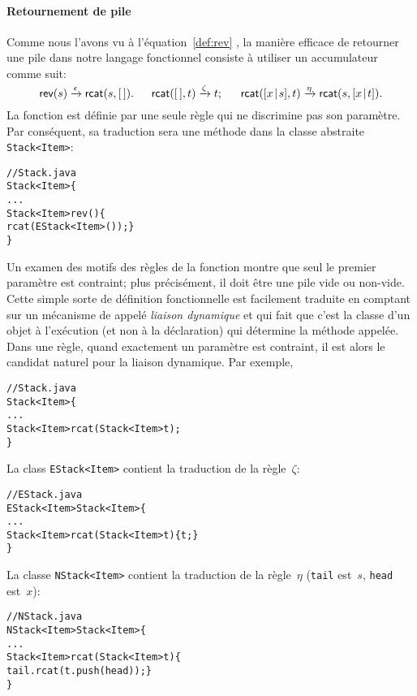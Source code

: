 \paragraph{Retournement de pile}

Comme nous l'avons vu à l'équation~\eqref{def:rev} ,
la manière efficace de retourner une pile dans notre langage
fonctionnel consiste à utiliser un accumulateur comme suit:
\begin{equation*}
\textsf{rev}(s) \xrightarrow{\smash{\epsilon}}
             \textsf{rcat}(s,[\,]).\quad\;\;
\textsf{rcat}([\,],t) \xrightarrow{\smash{\zeta}} t;\quad\;\;
\textsf{rcat}([{x}\!\mid\!{s}],t) \xrightarrow{\smash{\eta}}
                          \textsf{rcat}(s,[{x}\!\mid\!{t}]).
\end{equation*}
La fonction  est définie par une seule règle qui ne
discrimine pas son paramètre. Par conséquent, sa traduction sera une
méthode dans la classe abstraite \texttt{Stack<Item>}:
\begin{alltt}
// Stack.java
\public \abstractX \class Stack<Item> \{
  ...
  \public Stack<Item> rev() \{
    \return rcat(\new EStack<Item>()); \}
\}
\end{alltt}
Un examen des motifs des règles de la fonction  montre que
seul le premier paramètre est contraint; plus précisément, il doit
être une pile vide ou non-vide. Cette simple sorte de définition
fonctionnelle est facilement traduite en comptant sur un mécanisme de
\Java appelé \emph{liaison dynamique} et qui fait que c'est la classe
d'un objet à l'exécution (et non à la déclaration) qui détermine la
méthode appelée. Dans une règle, quand exactement un paramètre est
contraint, il est alors le candidat naturel pour la liaison
dynamique. Par exemple,
\begin{alltt}
// Stack.java
\public \abstractX \class Stack<Item> \{
  ...
  \public \abstractX Stack<Item> rcat(\final Stack<Item> t);
\}
\end{alltt}
La class \texttt{EStack<Item>} contient la traduction de la règle~\(\zeta\):
\begin{alltt}
// EStack.java
\public \final \class EStack<Item> \extends Stack<Item> \{
  ...
  \public Stack<Item> rcat(\final Stack<Item> t) \{ \return t; \}
\}
\end{alltt}
La classe \texttt{NStack<Item>} contient la traduction de la
règle~\(\eta\) (\texttt{tail} est~\(s\), \texttt{head} est~\(x\)):
\begin{alltt}
// NStack.java
\public \final \class NStack<Item> \extends Stack<Item> \{
  ...
  \public Stack<Item> rcat(\final Stack<Item> t) \{
    \return tail.rcat(t.push(head)); \}
\}
\end{alltt}


